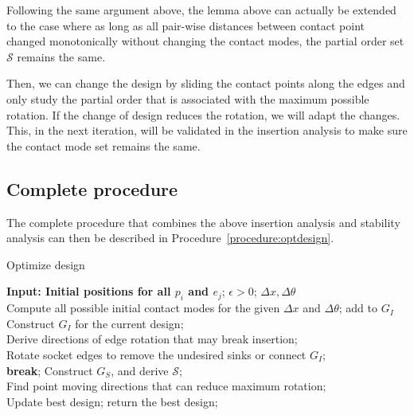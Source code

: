 \documentclass[letterpaper, 10 pt, conference]{ieeeconf}
\newenvironment{myprocedure}[1][htb]
  {\renewcommand{\algorithmcfname}{Procedure}%
   \begin{algorithm}[#1]%
  }{\end{algorithm}}
\begin{document}
Following the same argument above, the lemma above can actually be extended to the case where as long as all pair-wise distances between contact point changed monotonically without changing the contact modes, the partial order set $\mathcal{S}$ remains the same. 


Then, we can change the design by sliding the contact points along the edges and only study the partial order that is associated with the maximum possible rotation. If the change of design reduces the rotation, we will adapt the changes. This, in the next iteration, will be validated in the insertion analysis to make sure the contact mode set remains the same. 


\subsection{Complete procedure}

The complete procedure that combines the above insertion analysis and stability analysis can then be described in Procedure~\ref{procedure:optdesign}. 

\begin{myprocedure}
\caption{Optimize design}
\label{procedure:optdesign}
\textbf{Input: Initial positions for all $p_i$ and $e_j$}; $\epsilon > 0$; $\Delta x, \Delta\theta$\\
Compute all possible initial contact modes for the given $\Delta x$ and $\Delta\theta$; add to $G_I$\\
 {
	Construct $G_I$ for the current design;\\
	Derive directions of edge rotation that may break insertion;\\
	 {
		Rotate socket edges to remove the undesired sinks or connect $G_I$; \\
		 {
			\textbf{break};
		} 
	}
	Construct $G_S$, and derive $\mathcal{S}$;\\
	Find point moving directions that can reduce maximum rotation; \\
	 {
		Update best design;
	}
}
return the best design; 
\end{myprocedure}
\end{document}
